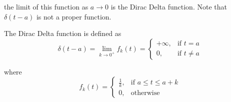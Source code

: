 the limit of this function as $a \to 0$ is the Dirac Delta function. Note that 
$\delta(t - a)$ is not a proper function.

\begin{definition}
    The Dirac Delta function is defined as 
    \begin{equation}
        \delta(t - a) = \lim_{k \to 0^+} f_k(t) = \begin{cases}
           +\infty, & \text{if } t = a\\
           0, & \text{if } t \neq a
        \end{cases}
    \end{equation}

    where 
    \begin{equation}
        f_k(t) = \begin{cases}
            \displaystyle \frac{1}{k}, & \text{if } a \leq t \leq a+k\\[0.75em]
            0, & \text{otherwise}
        \end{cases}
    \end{equation}
\end{definition}

